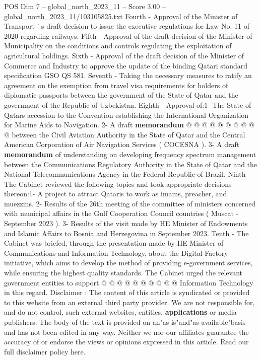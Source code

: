 \begin{textsample}{POS Dim 7 – global\_north\_2023\_11 – Score 3.00 – global\_north\_2023\_11/103105825.txt}
Fourth - Approval of the Minister of Transport ' s draft decision to issue the executive regulations for Law No. 11 of 2020 regarding railways.
Fifth - Approval of the draft decision of the Minister of Municipality on the conditions and controls regulating the exploitation of agricultural holdings.
Sixth - Approval of the draft decision of the Minister of Commerce and Industry to approve the update of the binding Qatari standard specification GSO QS 581.
Seventh - Taking the necessary measures to ratify an agreement on the exemption from travel visa requirements for holders of diplomatic passports between the government of the State of Qatar and the government of the Republic of Uzbekistan.
Eighth - Approval of:1- The State of Qatars accession to the Convention establishing the International Organization for Marine Aids to Navigation. 2- A draft \textbf{memorandum} @ @ @ @ @ @ @ @ @ @ between the Civil Aviation Authority in the State of Qatar and the Central American Corporation of Air Navigation Services ( COCESNA ). 3- A draft \textbf{memorandum} of understanding on developing frequency spectrum management between the Communications Regulatory Authority in the State of Qatar and the National Telecommunications Agency in the Federal Republic of Brazil.
Ninth - The Cabinet reviewed the following topics and took appropriate decisions thereon:1- A project to attract Qataris to work as imams, preacher, and muezzins. 2- Results of the 26th meeting of the committee of ministers concerned with municipal affairs in the Gulf Cooperation Council countries ( Muscat - September 2023 ). 3- Results of the visit made by HE Minister of Endowments and Islamic Affairs to Bosnia and Herzegovina in September 2023.
Tenth - The Cabinet was briefed, through the presentation made by HE Minister of Communications and Information Technology, about the Digital Factory initiative, which aims to develop the method of providing e-government services, while ensuring the highest quality standards.
The Cabinet urged the relevant government entities to support @ @ @ @ @ @ @ @ @ @ Information Technology in this regard.
Disclaimer : The content of this article is syndicated or provided to this website from an external third party provider.
We are not responsible for, and do not control, such external websites, entities, \textbf{applications} or media publishers.
The body of the text is provided on an"as is"and"as available"basis and has not been edited in any way.
Neither we nor our affiliates guarantee the accuracy of or endorse the views or opinions expressed in this article.
Read our full disclaimer policy here.

\end{textsample}
